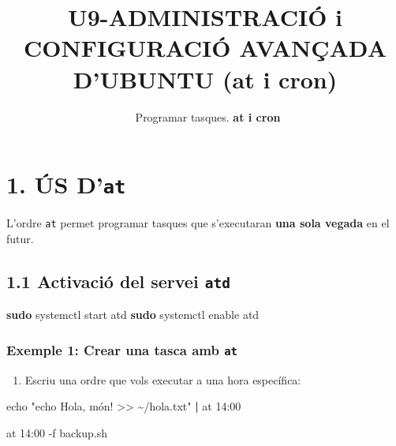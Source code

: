 \documentclass[
  12 pt,
  a4paper,
]{article}
\title{U9-ADMINISTRACIÓ i CONFIGURACIÓ AVANÇADA D'UBUNTU (at i cron)}
\subtitle{~Programar tasques. \textbf{at i cron}}
\author{}
\date{\vspace{-2.5em}}
\newenvironment{Shaded}{\begin{snugshade}}{\end{snugshade}}
\newcommand{\AttributeTok}[1]{\textcolor[rgb]{0.13,0.29,0.53}{#1}}
\newcommand{\BuiltInTok}[1]{#1}
\newcommand{\ExtensionTok}[1]{#1}
\newcommand{\FunctionTok}[1]{\textcolor[rgb]{0.13,0.29,0.53}{\textbf{#1}}}
\newcommand{\KeywordTok}[1]{\textcolor[rgb]{0.13,0.29,0.53}{\textbf{#1}}}
\newcommand{\NormalTok}[1]{#1}
\newcommand{\StringTok}[1]{\textcolor[rgb]{0.31,0.60,0.02}{#1}}
\providecommand{\tightlist}{%
  \setlength{\itemsep}{0pt}\setlength{\parskip}{0pt}}
\begin{document}
\maketitle

\section{\texorpdfstring{1. ÚS
D'\texttt{at}}{1. ÚS D'at}}\label{uxfas-dat}

L'ordre \texttt{at} permet programar tasques que s'executaran
\textbf{una sola vegada} en el futur.

\subsection{\texorpdfstring{1.1 Activació del servei
\texttt{atd}}{1.1 Activació del servei atd}}\label{activaciuxf3-del-servei-atd}

\begin{Shaded}
\begin{Highlighting}[]
\FunctionTok{sudo}\NormalTok{ systemctl start atd}
\FunctionTok{sudo}\NormalTok{ systemctl enable atd}
\end{Highlighting}
\end{Shaded}

\subsubsection{\texorpdfstring{Exemple 1: Crear una tasca amb
\texttt{at}}{Exemple 1: Crear una tasca amb at}}\label{exemple-1-crear-una-tasca-amb-at}

\begin{enumerate}
\def\labelenumi{\arabic{enumi}.}
\tightlist
\item
  Escriu una ordre que vols executar a una hora específica:
\end{enumerate}

\begin{Shaded}
\begin{Highlighting}[]
\BuiltInTok{echo} \StringTok{"echo \textquotesingle{}Hola, món!\textquotesingle{} \textgreater{}\textgreater{} \textasciitilde{}/hola.txt"} \KeywordTok{|} \ExtensionTok{at}\NormalTok{ 14:00}
\end{Highlighting}
\end{Shaded}

\begin{Shaded}
\begin{Highlighting}[]
\ExtensionTok{at}\NormalTok{ 14:00 }\AttributeTok{{-}f}\NormalTok{ backup.sh}
\end{Highlighting}
\end{Shaded}
\end{document}
